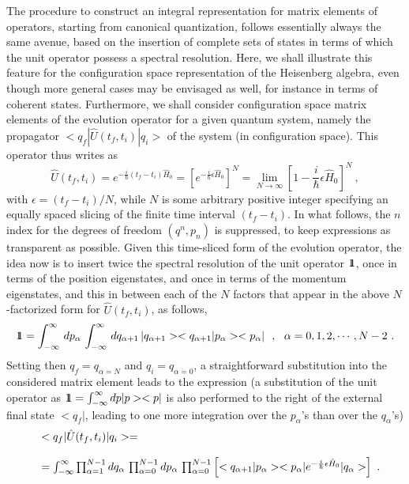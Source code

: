 \documentclass[a4paper,11pt]{article}
\def\one{1\hskip -.37em 1}
\begin{document}
The procedure to construct an integral representation for matrix
elements of operators, starting from canonical quantization, follows
essentially always the same avenue, based on the insertion of
complete sets of states in terms of which the unit operator possess
a spectral resolution. Here, we shall illustrate this feature for
the configuration space representation of the Heisenberg algebra,
even though more general cases may be envisaged as well, for instance
in terms of coherent states. Furthermore,
we shall consider configuration space matrix elements of the evolution
operator for a given quantum system, namely the propagator
$<q_f|\hat{U}(t_f,t_i)|q_i>$ of the system (in configuration space).
This operator thus writes as
\begin{equation}
\hat{U}(t_f,t_i)=e^{-\frac{i}{\hbar}(t_f-t_i)\hat{H}_0}=
\left[e^{-\frac{i}{\hbar}\epsilon\hat{H}_0}\right]^N=
\lim_{N\rightarrow\infty}\left[1-\frac{i}{\hbar}\epsilon\hat{H}_0\right]^N\ ,
\end{equation}
with $\epsilon=(t_f-t_i)/N$, while $N$ is some arbitrary positive
integer specifying an equally spaced slicing of the finite time
interval $(t_f-t_i)$. In what follows, the $n$ index for the degrees
of freedom $(q^n,p_n)$ is suppressed, to keep expressions as
transparent as possible. Given this time-sliced form of the evolution
operator, the idea now is to insert twice the spectral resolution of the
unit operator $\one$, once in terms of the position eigenstates,
and once in terms of the momentum eigenstates, and this in between each of
the $N$ factors that appear in the above $N$-factorized form for
$\hat{U}(t_f,t_i)$, as follows,
\begin{equation}
\one=\int_{-\infty}^\infty\,dp_\alpha\,\int_{-\infty}^\infty\,
dq_{\alpha+1}\,|q_{\alpha+1}><q_{\alpha+1}|p_\alpha><p_\alpha|
\ \ ,\ \ \alpha=0,1,2,\cdots,N-2\ .
\end{equation}
Setting then $q_f=q_{\alpha=N}$ and $q_i=q_{\alpha=0}$, a straightforward
substitution into the considered matrix element leads to the expression
(a substitution of the unit operator as
$\one=\int_{-\infty}^\infty dp|p><p|$ is also
performed to the right of the external final state $<q_f|$, leading
to one more integration over the $p_\alpha$'s than over the $q_\alpha$'s)
\begin{equation}
\begin{array}{r l}
&<q_f|\hat{U}(t_f,t_i)|q_i>= \\
 & \\
&=\int_{-\infty}^\infty\prod_{\alpha=1}^{N-1}
dq_\alpha\,\prod_{\alpha=0}^{N-1}dp_\alpha\,
\prod_{\alpha=0}^{N-1}\left[<q_{\alpha+1}|p_\alpha>
<p_\alpha|e^{-\frac{i}{\hbar}\epsilon\hat{H}_0}|q_\alpha>\right]\ .
\end{array}
\end{equation}
\end{document}
